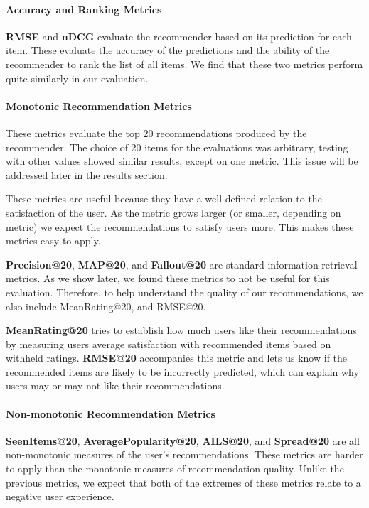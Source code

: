 \documentclass[letterpaper]{sig-alternate}
\begin{document}
  
  \paragraph{Accuracy and Ranking Metrics}
  {\bf RMSE} and {\bf nDCG} evaluate the recommender based on its prediction for each item.
  These evaluate the accuracy of the predictions and the ability of the recommender to rank the list of all items.
  We find that these two metrics perform quite similarly in our evaluation.

  \addtocounter{footnote}{1}

  \paragraph{Monotonic Recommendation Metrics}
  These metrics evaluate the top 20 recommendations produced by the recommender.
  The choice of 20 items for the evaluations was arbitrary, testing with other values showed similar results, except on one metric.
  This issue will be addressed later in the results section.
  
  These metrics are useful because they have a well defined relation to the satisfaction of the user.
  As the metric grows larger (or smaller, depending on metric) we expect the recommendations to satisfy users more.
  This makes these metrics easy to apply.

  {\bf Precision@20}, {\bf MAP@20}, and {\bf Fallout@20} are standard information retrieval metrics.
  As we show later, we found these metrics to not be useful for this evaluation.
  Therefore, to help understand the quality of our recommendations, we also include MeanRating@20, and RMSE@20.

  {\bf MeanRating@20} tries to establish how much users like their recommendations by measuring users average satisfaction with recommended items based on withheld ratings.
  {\bf RMSE@20} accompanies this metric and lets us know if the recommended items are likely to be incorrectly predicted, which can explain why users may or may not like their recommendations.
  
  \paragraph{Non-monotonic Recommendation Metrics}
  {\bf SeenItems@20}, {\bf AveragePopularity@20}, {\bf AILS@20}, and {\bf Spread@20} are all non-monotonic measures of the user's recommendations.
  These metrics are harder to apply than the monotonic measures of recommendation quality.
  Unlike the previous metrics, we expect that both of the extremes of these metrics relate to a negative user experience.
\end{document}
